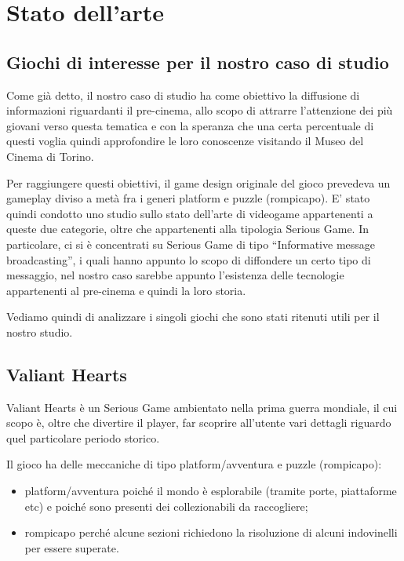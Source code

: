 \newpage


\section{Stato dell'arte}
\label{chap:stato_dell_arte}

\subsection{Giochi di interesse per il nostro caso di studio}

Come già detto, il nostro caso di studio ha come obiettivo la diffusione di informazioni riguardanti il pre-cinema, allo scopo di attrarre l'attenzione dei più giovani verso questa tematica e con la speranza che una certa percentuale di questi voglia quindi approfondire le loro conoscenze visitando il Museo del Cinema di Torino.

Per raggiungere questi obiettivi, il game design originale del gioco  prevedeva un gameplay diviso a metà fra i generi platform e puzzle (rompicapo). E' stato quindi condotto uno studio sullo stato dell'arte di videogame appartenenti a queste due categorie, oltre che appartenenti alla tipologia Serious Game. In particolare, ci si è concentrati su Serious Game di tipo ``Informative message broadcasting'', i quali hanno appunto lo scopo di diffondere un certo tipo di messaggio, nel nostro caso sarebbe appunto l'esistenza delle tecnologie appartenenti al pre-cinema e quindi la loro storia.

Vediamo quindi di analizzare i singoli giochi che sono stati ritenuti utili per il nostro studio.


\subsection{Valiant Hearts}
\label{sec:stato_arte_valiant_hearts}

Valiant Hearts è un Serious Game ambientato nella prima guerra mondiale, il cui scopo è, oltre che divertire il player, far scoprire all'utente vari dettagli riguardo quel particolare periodo storico.

Il gioco ha delle meccaniche di tipo platform/avventura e puzzle (rompicapo): 

\begin{itemize}
\item platform/avventura poiché il mondo è esplorabile (tramite porte, piattaforme etc) e poiché sono presenti dei collezionabili da raccogliere; 
\item rompicapo perché alcune sezioni richiedono la risoluzione di alcuni indovinelli per essere superate.
\end{itemize}

